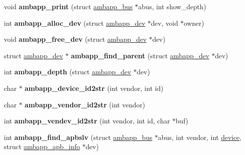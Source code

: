 \begin{DoxyCompactItemize}
void {\bfseries ambapp\+\_\+print} (struct \mbox{\hyperlink{structambapp__bus}{ambapp\+\_\+bus}} $\ast$abus, int show\+\_\+depth)
\item 
\mbox{\label{group__amba_ga93b5bc5f8779a3b5463d6821239ab65a}} 
int {\bfseries ambapp\+\_\+alloc\+\_\+dev} (struct \mbox{\hyperlink{structambapp__dev}{ambapp\+\_\+dev}} $\ast$dev, void $\ast$owner)
\item 
\mbox{\label{group__amba_gaccbc80734328ca56b683c55ac2eea694}} 
void {\bfseries ambapp\+\_\+free\+\_\+dev} (struct \mbox{\hyperlink{structambapp__dev}{ambapp\+\_\+dev}} $\ast$dev)
\item 
\mbox{\label{group__amba_ga21963d2d1558bbb2bda20a8e9f0f03a7}} 
struct \mbox{\hyperlink{structambapp__dev}{ambapp\+\_\+dev}} $\ast$ {\bfseries ambapp\+\_\+find\+\_\+parent} (struct \mbox{\hyperlink{structambapp__dev}{ambapp\+\_\+dev}} $\ast$dev)
\item 
\mbox{\label{group__amba_ga48f40078376a36b32d2a5922c59d8316}} 
int {\bfseries ambapp\+\_\+depth} (struct \mbox{\hyperlink{structambapp__dev}{ambapp\+\_\+dev}} $\ast$dev)
\item 
\mbox{\label{group__amba_gad229fbbfa8f29e8484a6f624ab7f50c5}} 
char $\ast$ {\bfseries ambapp\+\_\+device\+\_\+id2str} (int vendor, int id)
\item 
\mbox{\label{group__amba_gabe315fe6645dd542efae6d4e1d9f971d}} 
char $\ast$ {\bfseries ambapp\+\_\+vendor\+\_\+id2str} (int vendor)
\item 
\mbox{\label{group__amba_ga57575fd502e74ccb0e3e886f6c50b604}} 
int {\bfseries ambapp\+\_\+vendev\+\_\+id2str} (int vendor, int id, char $\ast$buf)
\item 
\mbox{\label{group__amba_gaa3ec6fd1236ff7eb03d37c84474257c0}} 
int {\bfseries ambapp\+\_\+find\+\_\+apbslv} (struct \mbox{\hyperlink{structambapp__bus}{ambapp\+\_\+bus}} $\ast$abus, int vendor, int \mbox{\hyperlink{structdevice}{device}}, struct \mbox{\hyperlink{structambapp__apb__info}{ambapp\+\_\+apb\+\_\+info}} $\ast$dev)
\item 
\mbox{\label{group__amba_ga765680069e765d71db4888ab4af53c3a}} 

\end{DoxyCompactItemize}
